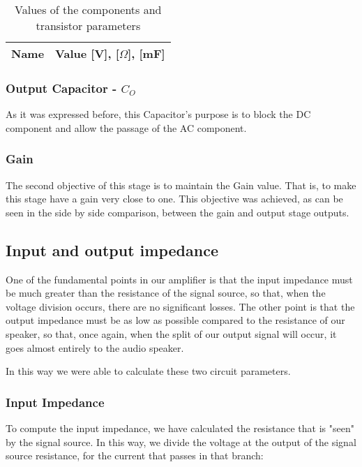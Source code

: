 \begin{table}[ht]
  \centering
  \begin{tabular}{|l|r|}
    \hline    
    {\bf Name} & {\bf Value [V], [$\Omega$], [mF]} \\ \hline
    
  \end{tabular}
  \caption{Values of the components and  transistor parameters}
  \label{tab:r1}
\end{table}
\vspace{0.3in}

\subsubsection{Output Capacitor - $C_O$}

As it was expressed before, this Capacitor's purpose is to block the DC component and allow the passage of the AC component.


\subsubsection{Gain}

The second objective of this stage is to maintain the Gain value. That is, to make this stage have a gain very close to one. This objective was achieved, as can be seen in the side by side comparison, between the gain and output stage outputs. 


\subsection{Input and output impedance}

One of the fundamental points in our amplifier is that the input impedance must be much greater than the resistance of the signal source, so that, when the voltage division occurs, there are no significant losses. The other point is that the output impedance must be as low as possible compared to the resistance of our speaker, so that, once again, when the split of our output signal will occur, it goes almost entirely to the audio speaker.

In this way we were able to calculate these two circuit parameters.

\subsubsection{Input Impedance}

To compute the input impedance, we have calculated the resistance that is "seen" by the signal source. In this way, we divide the voltage at the output of the signal source resistance, for the current that passes in that branch: 



